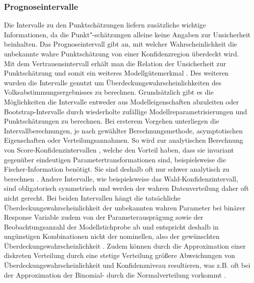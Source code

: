 \documentclass{Vorlage}
\begin{document}
\subsubsection{Prognoseintervalle}
Die Intervalle zu den Punktschätzungen liefern zusätzliche wichtige Informationen, da die Punkt"-schätzungen alleine keine Angaben zur Unsicherheit beinhalten. Das Prognoseintervall gibt an, mit welcher Wahrscheinlichkeit die unbekannte wahre Punktschätzung von einer Konfidenzregion überdeckt wird. Mit dem Vertrauensintervall erhält man die Relation der Unsicherheit zur Punktschätzung und somit ein weiteres Modellgütemerkmal \cite[p. 471]{fahrmeir2013regression}. Des weiteren wurden die Intervalle genutzt um Überdeckungswahrscheinlichkeiten des Volksabstimmungsergebnisses \cite{Amt} zu berechnen. Grundsätzlich gibt es die Möglichkeiten die Intervalle entweder aus Modelleigenschaften abzuleiten oder Bootstrap-Intervalle durch wiederholte zufällige Modellreparametrisierungen und Punktschätzungen zu berechnen. Bei ersterem Vorgehen unterliegen die Intervallberechnungen, je nach gewählter Berechnungsmethode, asymptotischen Eigenschaften oder Verteilungsannahmen. So wird zur analytischen Berechnung von Score-Konfidenzintervallen \cite[p. 64 ff.]{held2008}, welche den Vorteil haben, dass sie invariant gegenüber eindeutigen Parametertransformationen sind, beispielsweise die Fischer-Information benötigt. Sie sind deshalb oft nur schwer analytisch zu berechnen \cite[p. 74]{held2008}. Andere Intervalle, wie beispielsweise das Wald-Konfidenzintervall, sind obligatorisch symmetrisch \cite[p. 60]{held2008} und werden der wahren Datenverteilung daher oft nicht gerecht. Bei beiden Intervallen hängt die tatsächliche Überdeckungswahrscheinlichkeit der unbekannten wahren Parameter bei binärer Response Variable zudem von der Parameterausprägung sowie der Beobachtungsanzahl der Modellstichprobe ab und entspricht deshalb in ungünstigen Kombinationen nicht der nominellen, also der gewünschten Überdeckungswahrscheinlichkeit \cite{Int}. Zudem können durch die Approximation einer diskreten Verteilung 
durch eine stetige Verteilung größere Abweichungen von Überdeckungswahrscheinlichkeit und Konfidenzniveau resultieren, was z.B. oft bei der Approximation der Binomial- durch die Normalverteilung 
vorkommt \cite[p. 102]{Int}.
\end{document}

